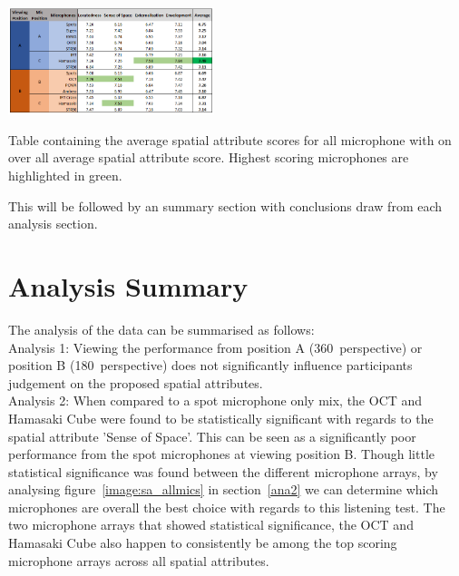 	\begin{table}
	\begin{center}
		\includegraphics[width=0.45\textwidth]{images/graphs/results_sum_graph_V3.PNG}
		\caption{Table containing the average spatial attribute scores for all microphone with on over all average spatial attribute score. Highest scoring microphones are highlighted in green.}
		\label{image:results_sum} 
	\end{center}
	\end{table}	

	This will be followed by an summary section with conclusions draw from each analysis section.

	
	
	
	
	
	

	\section{Analysis Summary}

		The analysis of the data can be summarised as follows:\\

		Analysis 1: Viewing the performance from position A (360\textdegree~perspective) or position B (180\textdegree~perspective) does not significantly influence participants judgement on the proposed spatial attributes. \\

		Analysis 2: When compared to a spot microphone only mix, the OCT and Hamasaki Cube were found to be statistically significant with regards to the spatial attribute 'Sense of Space'. This can be seen as a significantly poor performance from the spot microphones at viewing position B. Though little statistical significance was found between the different microphone arrays, by analysing figure~\ref{image:sa_allmics} in section~\ref{ana2} we can determine which microphones are overall the best choice with regards to this listening test. The two microphone arrays that showed statistical significance, the OCT and Hamasaki Cube also happen to consistently be among the top scoring microphone arrays across all spatial attributes. \\

